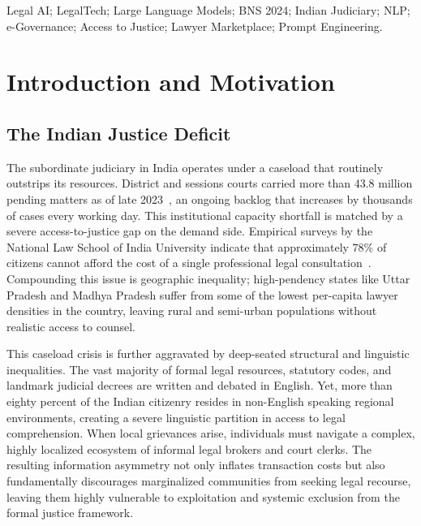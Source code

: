 \documentclass[conference]{IEEEtran}
\begin{document}
\begin{IEEEkeywords}
Legal AI; LegalTech; Large Language Models; BNS 2024; Indian Judiciary; NLP; e-Governance; Access to Justice; Lawyer Marketplace; Prompt Engineering.
\end{IEEEkeywords}

\section{Introduction and Motivation}
\label{sec:intro}

\subsection{The Indian Justice Deficit}
The subordinate judiciary in India operates under a caseload that routinely outstrips its resources. District and sessions courts carried more than 43.8 million pending matters as of late 2023~\cite{ncrb2023}, an ongoing backlog that increases by thousands of cases every working day. This institutional capacity shortfall is matched by a severe access-to-justice gap on the demand side. Empirical surveys by the National Law School of India University indicate that approximately 78\% of citizens cannot afford the cost of a single professional legal consultation~\cite{nlsiu2023}. Compounding this issue is geographic inequality; high-pendency states like Uttar Pradesh and Madhya Pradesh suffer from some of the lowest per-capita lawyer densities in the country, leaving rural and semi-urban populations without realistic access to counsel.

This caseload crisis is further aggravated by deep-seated structural and linguistic inequalities. The vast majority of formal legal resources, statutory codes, and landmark judicial decrees are written and debated in English. Yet, more than eighty percent of the Indian citizenry resides in non-English speaking regional environments, creating a severe linguistic partition in access to legal comprehension. When local grievances arise, individuals must navigate a complex, highly localized ecosystem of informal legal brokers and court clerks. The resulting information asymmetry not only inflates transaction costs but also fundamentally discourages marginalized communities from seeking legal recourse, leaving them highly vulnerable to exploitation and systemic exclusion from the formal justice framework.
\end{document}
